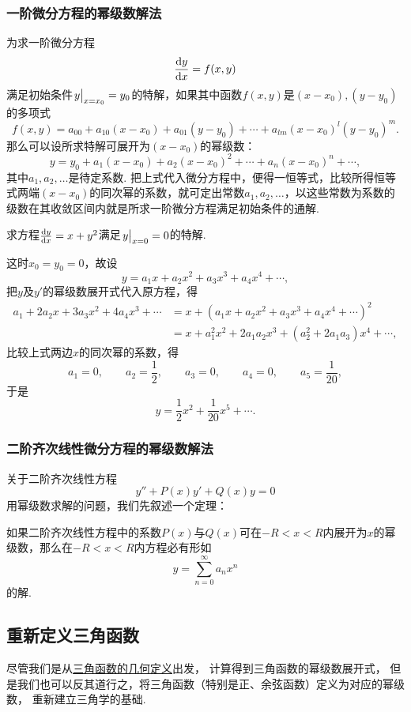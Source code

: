 \subsubsection{一阶微分方程的幂级数解法}
为求一阶微分方程\[
\dv{y}{x} = f(x,y)
\]满足初始条件\(\eval{y}_{x=x_0} = y_0\)的特解，如果其中函数\(f(x,y)\)是\((x-x_0),(y-y_0)\)的多项式\[
f(x,y) = a_{00} + a_{10} (x-x_0) + a_{01} (y-y_0) + \dotsb + a_{lm} (x-x_0)^l (y-y_0)^m.
\]那么可以设所求特解可展开为\((x-x_0)\)的幂级数：\[
y = y_0 + a_1 (x-x_0) + a_2 (x-x_0)^2 + \dotsb + a_n (x-x_0)^n + \dotsb,
\]其中\(a_1,a_2,\dotsc\)是待定系数.
把上式代入微分方程中，便得一恒等式，比较所得恒等式两端\((x-x_0)\)的同次幂的系数，就可定出常数\(a_1,a_2,\dotsc\)，以这些常数为系数的级数在其收敛区间内就是所求一阶微分方程满足初始条件的通解.

\begin{example}
求方程\(\dv{y}{x} = x + y^2\)满足\(\eval{y}_{x=0}=0\)的特解.
\begin{solution}
这时\(x_0=y_0=0\)，故设\[
y = a_1 x + a_2 x^2 + a_3 x^3 + a_4 x^4 + \dotsb,
\]把\(y\)及\(y'\)的幂级数展开式代入原方程，得\begin{align*}
a_1 + 2a_2 x + 3a_3 x^2 + 4a_4 x^3 + \dotsb
&= x + (a_1 x + a_2 x^2 + a_3 x^3 + a_4 x^4 + \dotsb)^2 \\
&= x + a_1^2 x^2 + 2a_1a_2 x^3 + (a_2^2 + 2a_1a_3) x^4 + \dotsb,
\end{align*}
比较上式两边\(x\)的同次幂的系数，得\[
a_1 = 0, \qquad
a_2 = \frac{1}{2}, \qquad
a_3 = 0, \qquad
a_4 = 0, \qquad
a_5 = \frac{1}{20},
\]于是\[
y = \frac{1}{2} x^2 + \frac{1}{20} x^5 + \dotsb.
\]
\end{solution}
\end{example}

\subsubsection{二阶齐次线性微分方程的幂级数解法}
关于二阶齐次线性方程\[
y'' + P(x) y' + Q(x) y = 0
\]用幂级数求解的问题，我们先叙述一个定理：
\begin{theorem}
如果二阶齐次线性方程中的系数\(P(x)\)与\(Q(x)\)可在\(-R<x<R\)内展开为\(x\)的幂级数，那么在\(-R<x<R\)内方程必有形如\[
y = \sum\limits_{n=0}^\infty a_n x^n
\]的解.
\end{theorem}

\subsection{重新定义三角函数}
尽管我们是从\hyperref[definition:函数.三角函数的几何定义]{三角函数的几何定义}出发，%
计算得到三角函数的幂级数展开式，%
但是我们也可以反其道行之，将三角函数（特别是正、余弦函数）定义为对应的幂级数，%
重新建立三角学的基础.

